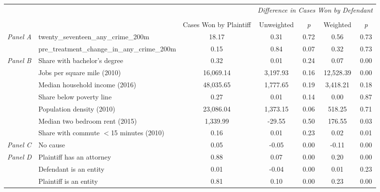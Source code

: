 \begin{tabular}{llccccc}
\toprule
 &  & \textit{} & \multicolumn{4}{c}{\textit{Difference in Cases Won by Defendant}} \\
\cline{4-7}
\\
 &  & Cases Won by Plaintiff & Unweighted & \emph{p} & Weighted & \emph{p} \\
\midrule
\multirow[c]{2}{3cm}{\textit{Panel A}} & twenty_seventeen_any_crime_200m & 18.17 & 0.31 & 0.72 & 0.56 & 0.73 \\
 & pre_treatment_change_in_any_crime_200m & 0.15 & 0.84 & 0.07 & 0.32 & 0.73 \\
\cline{1-7}
\multirow[c]{7}{3cm}{\textit{Panel B}} & Share with bachelor's degree & 0.32 & 0.01 & 0.24 & 0.07 & 0.00 \\
 & Jobs per square mile (2010) & 16,069.14 & 3,197.93 & 0.16 & 12,528.39 & 0.00 \\
 & Median household income (2016) & 48,035.65 & 1,777.65 & 0.19 & 3,418.21 & 0.18 \\
 & Share below poverty line & 0.27 & 0.01 & 0.14 & 0.00 & 0.87 \\
 & Population density (2010) & 23,086.04 & 1,373.15 & 0.06 & 518.25 & 0.71 \\
 & Median two bedroom rent (2015) & 1,339.99 & -29.55 & 0.50 & 176.55 & 0.03 \\
 & Share with commute $<$15 minutes (2010) & 0.16 & 0.01 & 0.23 & 0.02 & 0.01 \\
\cline{1-7}
\textit{Panel C} & No cause & 0.05 & -0.05 & 0.00 & -0.11 & 0.00 \\
\cline{1-7}
\multirow[c]{3}{3cm}{\textit{Panel D}} & Plaintiff has an attorney & 0.88 & 0.07 & 0.00 & 0.20 & 0.00 \\
 & Defendant is an entity & 0.01 & -0.04 & 0.00 & 0.01 & 0.23 \\
 & Plaintiff is an entity & 0.81 & 0.10 & 0.00 & 0.23 & 0.00 \\
\cline{1-7}
\bottomrule
\end{tabular}
